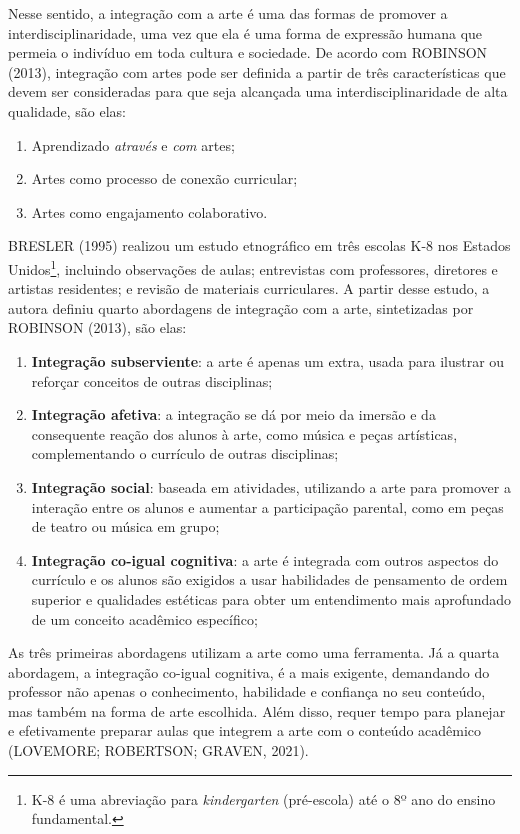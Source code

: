 \documentclass[
  letterpaper,
  DIV=11,
  numbers=noendperiod]{scrreprt}
\providecommand{\tightlist}{%
  \setlength{\itemsep}{0pt}\setlength{\parskip}{0pt}}\usepackage{longtable,booktabs,array}
\begin{document}
Nesse sentido, a integração com a arte é uma das formas de promover a
interdisciplinaridade, uma vez que ela é uma forma de expressão humana
que permeia o indivíduo em toda cultura e sociedade. De acordo com
ROBINSON (2013), integração com artes pode ser definida a partir de três
características que devem ser consideradas para que seja alcançada uma
interdisciplinaridade de alta qualidade, são elas:

\begin{enumerate}
\def\labelenumi{\arabic{enumi}.}
\tightlist
\item
  Aprendizado \emph{através} e \emph{com} artes;
\item
  Artes como processo de conexão curricular;
\item
  Artes como engajamento colaborativo.
\end{enumerate}

BRESLER (1995) realizou um estudo etnográfico em três escolas K-8 nos
Estados Unidos\footnote{K-8 é uma abreviação para \emph{kindergarten}
  (pré-escola) até o 8º ano do ensino fundamental.}, incluindo
observações de aulas; entrevistas com professores, diretores e artistas
residentes; e revisão de materiais curriculares. A partir desse estudo,
a autora definiu quarto abordagens de integração com a arte,
sintetizadas por ROBINSON (2013), são elas:

\begin{enumerate}
\def\labelenumi{\arabic{enumi}.}
\tightlist
\item
  \textbf{Integração subserviente}: a arte é apenas um extra, usada para
  ilustrar ou reforçar conceitos de outras disciplinas;
\item
  \textbf{Integração afetiva}: a integração se dá por meio da imersão e
  da consequente reação dos alunos à arte, como música e peças
  artísticas, complementando o currículo de outras disciplinas;
\item
  \textbf{Integração social}: baseada em atividades, utilizando a arte
  para promover a interação entre os alunos e aumentar a participação
  parental, como em peças de teatro ou música em grupo;
\item
  \textbf{Integração co-igual cognitiva}: a arte é integrada com outros
  aspectos do currículo e os alunos são exigidos a usar habilidades de
  pensamento de ordem superior e qualidades estéticas para obter um
  entendimento mais aprofundado de um conceito acadêmico específico;
\end{enumerate}

As três primeiras abordagens utilizam a arte como uma ferramenta. Já a
quarta abordagem, a integração co-igual cognitiva, é a mais exigente,
demandando do professor não apenas o conhecimento, habilidade e
confiança no seu conteúdo, mas também na forma de arte escolhida. Além
disso, requer tempo para planejar e efetivamente preparar aulas que
integrem a arte com o conteúdo acadêmico (LOVEMORE; ROBERTSON; GRAVEN,
2021).
\end{document}

